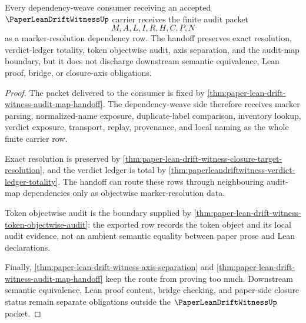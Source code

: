 \begin{theorem}
\label{thm:paperleandriftwitness-dependency-weave-handoff}
Every dependency-weave consumer receiving an accepted $\PaperLeanDriftWitnessUp$ carrier receives the finite audit packet
$$
M,A,L,I,R,H,C,P,N
$$
as a marker-resolution dependency row. The handoff preserves exact resolution, verdict-ledger totality, token objectwise audit, axis separation, and the audit-map boundary, but it does not discharge downstream semantic equivalence, Lean proof, bridge, or closure-axis obligations.
\end{theorem}
\begin{proof}
The packet delivered to the consumer is fixed by \autoref{thm:paper-lean-drift-witness-audit-map-handoff}. The dependency-weave side therefore receives marker parsing, normalized-name exposure, duplicate-label comparison, inventory lookup, verdict exposure, transport, replay, provenance, and local naming as the whole finite carrier row.

Exact resolution is preserved by \autoref{thm:paper-lean-drift-witness-closure-target-resolution}, and the verdict ledger is total by \autoref{thm:paperleandriftwitness-verdict-ledger-totality}. The handoff can route these rows through neighbouring audit-map dependencies only as objectwise marker-resolution data.

Token objectwise audit is the boundary supplied by \autoref{thm:paper-lean-drift-witness-token-objectwise-audit}: the exported row records the token object and its local audit evidence, not an ambient semantic equality between paper prose and Lean declarations.

Finally, \autoref{thm:paper-lean-drift-witness-axis-separation} and \autoref{thm:paper-lean-drift-witness-audit-map-handoff} keep the route from proving too much. Downstream semantic equivalence, Lean proof content, bridge checking, and paper-side closure status remain separate obligations outside the $\PaperLeanDriftWitnessUp$ packet.
\end{proof}

